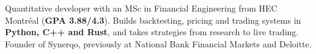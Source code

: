 
\begin{cvparagraph}

Quantitative developer with an MSc in Financial Engineering from HEC Montr\'eal (\textbf{GPA 3.88/4.3}). Builds backtesting, pricing and trading systems in \textbf{Python, C++ and Rust}, and takes strategies from research to live trading. Founder of Synerqo, previously at National Bank Financial Markets and Deloitte.

\end{cvparagraph}
